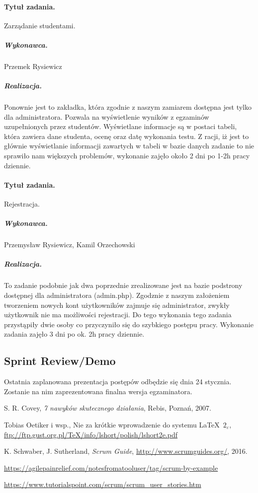 \documentclass[a4paper]{article}
\begin{document}
\paragraph{Tytuł zadania.} Zarządanie studentami.
\subparagraph{Wykonawca.} Przemek Rysiewicz
\subparagraph{Realizacja.} Ponownie jest to zakładka, która zgodnie z naszym zamiarem dostępna jest tylko dla administratora. Pozwala na wyświetlenie wyników z egzaminów uzupełnionych przez studentów. Wyświetlane informacje są w postaci tabeli, która zawiera dane studenta, ocenę oraz datę wykonania testu. Z racji, iż jest to głównie wyświetlanie informacji zawartych w tabeli w bazie danych zadanie to nie sprawiło nam większych problemów, wykonanie zajęło około 2 dni po 1-2h pracy dziennie.

\paragraph{Tytuł zadania.} Rejestracja.
\subparagraph{Wykonawca.} Przemysław Rysiewicz, Kamil Orzechowski
\subparagraph{Realizacja.} To zadanie podobnie jak dwa poprzednie zrealizowane jest na bazie podstrony dostępnej dla administratora (admin.php). Zgodznie z naszym założeniem tworzeniem nowych kont użytkowników zajmuje się administrator, zwykły użytkownik nie ma możliwości rejestracji. Do tego wykonania tego zadania przystąpiły dwie osoby co przyczyniło się do szybkiego postępu pracy.  Wykonanie zadania zajęło 3 dni po ok. 2h pracy dziennie.

\subsection{Sprint Review/Demo}
Ostatnia zaplanowana prezentacja postępów odbędzie się dnia 24 stycznia. Zostanie na nim zaprezentowana finalna wersja egzaminatora. 



\begin{thebibliography}{9}

 S. R. Covey, {\em 7 nawyków skutecznego działania}, Rebis, Poznań, 2007.

 Tobias Oetiker i wsp., Nie za krótkie wprowadzenie do systemu \LaTeX  \ $2_\varepsilon$, \url{ftp://ftp.gust.org.pl/TeX/info/lshort/polish/lshort2e.pdf}

 K. Schwaber, J. Sutherland, {\em Scrum Guide}, \url{http://www.scrumguides.org/}, 2016.

 \url{https://agilepainrelief.com/notesfromatooluser/tag/scrum-by-example}

 \url{https://www.tutorialspoint.com/scrum/scrum_user_stories.htm}

\end{thebibliography}
\end{document}
